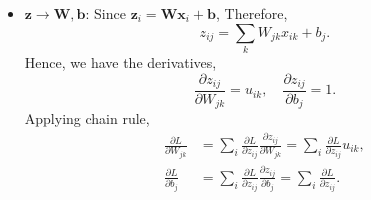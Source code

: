 \documentclass[11pt]{article}
\def\arr{\rightarrow}
\newcommand{\bbf}{\mathbf{b}}
\newcommand{\xbf}{\mathbf{x}}
\newcommand{\zbf}{\mathbf{z}}
\newcommand{\Wbf}{\mathbf{W}}
\begin{document}
\begin{enumerate}
\begin{enumerate}[(a)]
\begin{itemize}
\item $\zbf \arr \Wbf,\bbf$:  Since $\zbf_i = \Wbf\xbf_i + \bbf$,
Therefore,
\[
    z_{ij} = \sum_k W_{jk}x_{ik} + b_j.
\]
Hence, we have the derivatives,
\[
    \frac{\partial z_{ij}}{\partial W_{jk}} = u_{ik}, \quad
    \frac{\partial z_{ij}}{\partial b_{j}} = 1.
\]
Applying chain rule,
\begin{align*}
    \frac{\partial L}{\partial W_{jk}} &=
        \sum_i \frac{\partial L}{\partial z_{ij}}\frac{\partial z_{ij}}{\partial W_{jk}}
        = \sum_i \frac{\partial L}{\partial z_{ij}}u_{ik}, \\
    \frac{\partial L}{\partial b_{j}} &=
        \sum_i \frac{\partial L}{\partial z_{ij}}\frac{\partial z_{ij}}{\partial b_{j}}
        = \sum_i \frac{\partial L}{\partial z_{ij}}.
\end{align*}

\end{itemize}

\end{enumerate}



\end{enumerate}
\end{document}
